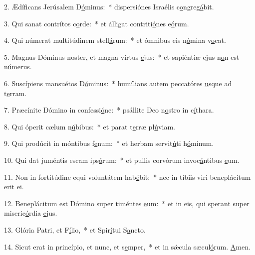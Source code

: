2. Ædíficans Jerúsalem D\uline{ó}minus:~* dispersiónes Israélis c\uline{o}ngreg\uline{á}bit.\par 
3. Qui sanat contrítos c\uline{o}rde:~* et álligat contriti\uline{ó}nes e\uline{ó}rum.\par 
4. Qui númerat multitúdinem stell\uline{á}rum:~* et ómnibus eis n\uline{ó}mina v\uline{o}cat.\par 
5. Magnus Dóminus noster, et magna virtus \uline{e}jus:~* et sapiéntiæ ejus n\uline{o}n est n\uline{ú}merus.\par 
6. Suscípiens mansuétos D\uline{ó}minus:~* humílians autem peccatóres \uline{u}sque ad t\uline{e}rram.\par 
7. Præcínite Dómino in confessi\uline{ó}ne:~* psállite Deo n\uline{o}stro in c\uline{í}thara.\par 
8. Qui óperit cælum n\uline{ú}bibus:~* et parat t\uline{e}rræ pl\uline{ú}viam.\par 
9. Qui prodúcit in móntibus f\uline{e}num:~* et herbam servit\uline{ú}ti h\uline{ó}minum.\par 
10. Qui dat juméntis escam ips\uline{ó}rum:~* et pullis corvórum invoc\uline{á}ntibus \uline{e}um.\par 
11. Non in fortitúdine equi voluntátem hab\uline{é}bit:~* nec in tíbiis viri beneplácitum \uline{e}rit \uline{e}i.\par 
12. Beneplácitum est Dómino super timéntes \uline{e}um:~* et in eis, qui sperant super miseric\uline{ó}rdia \uline{e}jus.\par 
13. Glória Patri, et F\uline{í}lio,~* et Spir\uline{í}tui S\uline{a}ncto.\par 
14. Sicut erat in princípio, et nunc, et s\uline{e}mper,~* et in sǽcula sæcul\uline{ó}rum. \uline{A}men.\par 
